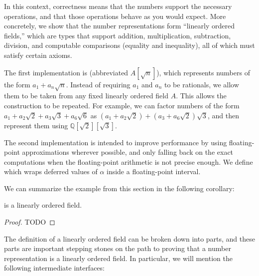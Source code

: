 In this context, correctness means that the numbers support the necessary
operations, and that those operations behave as you would expect. More
concretely, we show that the number representations form ``linearly ordered
fields,'' which are types that support addition, multiplication, subtraction,
division, and computable comparisons (equality and inequality), all of which
must satisfy certain axioms.

The first implementation is  (abbreviated $A[\sqrt{n}]$),
which represents numbers of the form $a_1 + a_n\sqrt{n}$. Instead of requiring
$a_1$ and $a_n$ to be rationals, we allow them to be taken from any fixed
linearly ordered field $A$.  This allows the construction to be repeated. For
example, we can factor numbers of the form $a_1 + a_2\sqrt{2} + a_3\sqrt{3} +
a_6\sqrt{6}$ as $(a_1 + a_2\sqrt{2}) + (a_3 + a_6\sqrt{2})\sqrt{3}$, and then
represent them using $ℚ[\sqrt{2}][\sqrt{3}]$.

The second implementation is intended to improve performance by using
floating-point approximations wherever possible, and only falling back on the
exact computations when the floating-point arithmetic is not precise enough. We
define  which wraps deferred values of $α$
inside a floating-point interval.

We can summarize the example from this section in the following corollary:
\begin{corollary}
  \label{thm:numberType}
   is a linearly ordered field.
\end{corollary}

\begin{proof}
  TODO
\end{proof}

The definition of a linearly ordered field can be broken down into parts, and
these parts are important stepping stones on the path to proving that a number
representation is a linearly ordered field. In particular, we will mention the
following intermediate interfaces:

